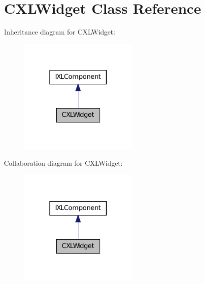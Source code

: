 \hypertarget{classCXLWidget}{
\section{CXLWidget Class Reference}
\label{classCXLWidget}
}


Inheritance diagram for CXLWidget:\nopagebreak
\begin{figure}[H]
\begin{center}
\leavevmode
\includegraphics[width=166pt]{classCXLWidget__inherit__graph}
\end{center}
\end{figure}


Collaboration diagram for CXLWidget:\nopagebreak
\begin{figure}[H]
\begin{center}
\leavevmode
\includegraphics[width=166pt]{classCXLWidget__coll__graph}
\end{center}
\end{figure}
